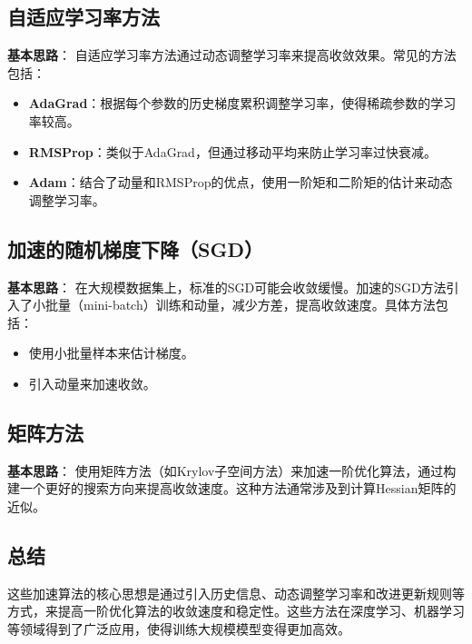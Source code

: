\documentclass[a4paper]{article}
\begin{document}
\subsection{自适应学习率方法}

\textbf{基本思路}：
自适应学习率方法通过动态调整学习率来提高收敛效果。常见的方法包括：
\begin{itemize}
    \item \textbf{AdaGrad}：根据每个参数的历史梯度累积调整学习率，使得稀疏参数的学习率较高。
    \item \textbf{RMSProp}：类似于AdaGrad，但通过移动平均来防止学习率过快衰减。
    \item \textbf{Adam}：结合了动量和RMSProp的优点，使用一阶矩和二阶矩的估计来动态调整学习率。
\end{itemize}

\subsection{加速的随机梯度下降（SGD）}

\textbf{基本思路}：
在大规模数据集上，标准的SGD可能会收敛缓慢。加速的SGD方法引入了小批量（mini-batch）训练和动量，减少方差，提高收敛速度。具体方法包括：
\begin{itemize}
    \item 使用小批量样本来估计梯度。
    \item 引入动量来加速收敛。
\end{itemize}

\subsection{矩阵方法}

\textbf{基本思路}：
使用矩阵方法（如Krylov子空间方法）来加速一阶优化算法，通过构建一个更好的搜索方向来提高收敛速度。这种方法通常涉及到计算Hessian矩阵的近似。

\subsection{总结}

这些加速算法的核心思想是通过引入历史信息、动态调整学习率和改进更新规则等方式，来提高一阶优化算法的收敛速度和稳定性。这些方法在深度学习、机器学习等领域得到了广泛应用，使得训练大规模模型变得更加高效。

\section{}
\end{document}
